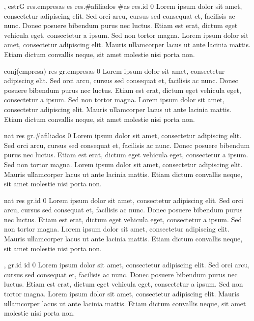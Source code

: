 {, }{estrG}
{
	\state res.empresas \asig es 							
	\state res.\#afiliados \asig \#as 						
	\state res.id  									
}
{0}
{Lorem ipsum dolor sit amet, consectetur adipiscing elit. Sed orci arcu, cursus sed consequat et, facilisis ac nunc. Donec posuere bibendum purus nec luctus. Etiam est erat, dictum eget vehicula eget, consectetur a ipsum. Sed non tortor magna. Lorem ipsum dolor sit amet, consectetur adipiscing elit. Mauris ullamcorper lacus ut ante lacinia mattis. Etiam dictum convallis neque, sit amet molestie nisi porta non.}

{}{conj(empresa)}
{
	\state res \asig gr.empresas 							
}
{0}
{Lorem ipsum dolor sit amet, consectetur adipiscing elit. Sed orci arcu, cursus sed consequat et, facilisis ac nunc. Donec posuere bibendum purus nec luctus. Etiam est erat, dictum eget vehicula eget, consectetur a ipsum. Sed non tortor magna. Lorem ipsum dolor sit amet, consectetur adipiscing elit. Mauris ullamcorper lacus ut ante lacinia mattis. Etiam dictum convallis neque, sit amet molestie nisi porta non.}

{}{nat}
{
	\state res \asig gr.\#afiliados 						
}
{0}
{Lorem ipsum dolor sit amet, consectetur adipiscing elit. Sed orci arcu, cursus sed consequat et, facilisis ac nunc. Donec posuere bibendum purus nec luctus. Etiam est erat, dictum eget vehicula eget, consectetur a ipsum. Sed non tortor magna. Lorem ipsum dolor sit amet, consectetur adipiscing elit. Mauris ullamcorper lacus ut ante lacinia mattis. Etiam dictum convallis neque, sit amet molestie nisi porta non.}

{}{nat}
{
	\state res \asig gr.id 									
}
{0}
{Lorem ipsum dolor sit amet, consectetur adipiscing elit. Sed orci arcu, cursus sed consequat et, facilisis ac nunc. Donec posuere bibendum purus nec luctus. Etiam est erat, dictum eget vehicula eget, consectetur a ipsum. Sed non tortor magna. Lorem ipsum dolor sit amet, consectetur adipiscing elit. Mauris ullamcorper lacus ut ante lacinia mattis. Etiam dictum convallis neque, sit amet molestie nisi porta non.}

{, }{}
{
	\state gr.id \asig id 									
}
{0}
{Lorem ipsum dolor sit amet, consectetur adipiscing elit. Sed orci arcu, cursus sed consequat et, facilisis ac nunc. Donec posuere bibendum purus nec luctus. Etiam est erat, dictum eget vehicula eget, consectetur a ipsum. Sed non tortor magna. Lorem ipsum dolor sit amet, consectetur adipiscing elit. Mauris ullamcorper lacus ut ante lacinia mattis. Etiam dictum convallis neque, sit amet molestie nisi porta non.}